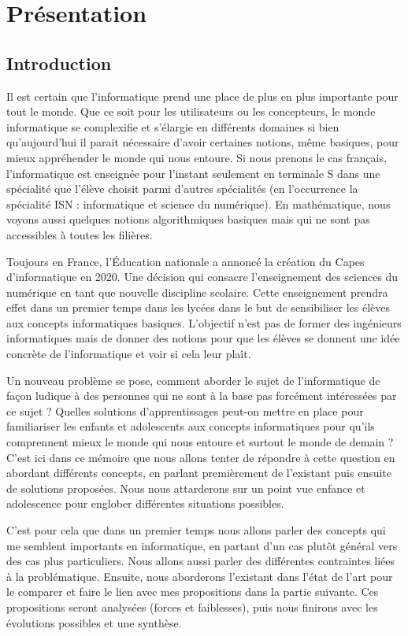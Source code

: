 

\chapter{Présentation}
\label{chap:presentation}

\section{Introduction}
Il est certain que l'informatique prend une place de plus en plus importante pour tout le monde. Que ce soit pour les utilisateurs ou les concepteurs, le monde informatique se complexifie et s'élargie en différents domaines si bien qu'aujourd'hui il parait nécessaire d'avoir certaines notions, même basiques, pour mieux appréhender le monde qui nous entoure. Si nous prenons le cas français, l'informatique est enseignée pour l'instant seulement en terminale S dans une spécialité que l'élève choisit parmi d'autres spécialités (en l'occurrence la spécialité ISN : informatique et science du numérique). En mathématique, nous voyons aussi quelques notions algorithmiques basiques mais qui ne sont pas accessibles à toutes les filières. 

Toujours en France, l’Éducation nationale a annoncé la création du Capes d’informatique en 2020. \cite{3} Une décision qui consacre l’enseignement des sciences du numérique en tant que nouvelle discipline scolaire. Cette enseignement prendra effet dans un premier temps dans les lycées dans le but de sensibiliser les élèves aux concepts informatiques basiques. L'objectif n'est pas de former des ingénieurs informatiques mais de donner des notions pour que les élèves se donnent une idée concrète de l'informatique et voir si cela leur plaît.

Un nouveau problème se pose, comment aborder le sujet de l'informatique de façon ludique à des personnes qui ne sont à la base pas forcément intéressées par ce sujet ? Quelles solutions d'apprentissages peut-on mettre en place pour familiariser les enfants et adolescents aux concepts informatiques pour qu'ils comprennent mieux le monde qui nous entoure et surtout le monde de demain ? C'est ici dans ce mémoire que nous allons tenter de répondre à cette question en abordant différents concepts, en parlant premièrement de l'existant puis ensuite de solutions proposées. Nous nous attarderons sur un point vue enfance et adolescence pour englober différentes situations possibles.

C'est pour cela que dans un premier temps nous allons parler des concepts qui me semblent importants en informatique, en partant d'un cas plutôt général vers des cas plus particuliers. Nous allons aussi parler des différentes contraintes liées à la problématique. Ensuite, nous aborderons l'existant dans l'état de l'art pour le comparer et faire le lien avec mes propositions dans la partie suivante. Ces propositions seront analysées (forces et faiblesses), puis nous finirons avec les évolutions possibles et une synthèse.

